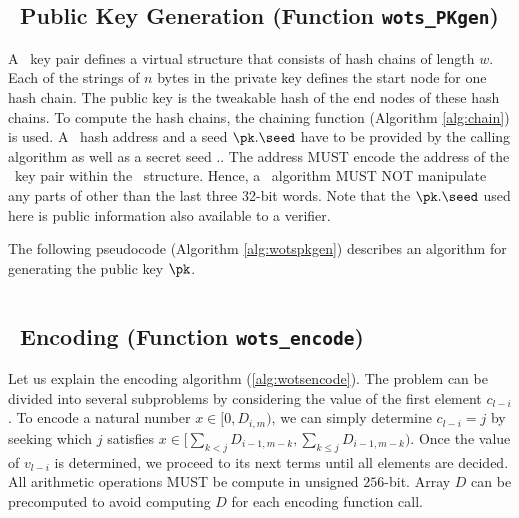 \subsection{\WOTSCS\ Public Key Generation (Function \texttt{wots\_PKgen})}

A \WOTSCS\ key pair defines a virtual structure that consists of \wotslen hash chains of length $w.$ Each of the \wotslen strings of $n$ bytes in the private key defines the start node for one hash chain. The public key is the tweakable hash of the end nodes of these hash chains. To compute the hash chains, the chaining function (Algorithm \ref{alg:chain}) is used. A \WOTSCS\ hash address \ADRS and a seed $\pk.\seed$ have to be provided by the calling algorithm as well as a secret seed \sk.\seed. The address \ADRS MUST encode the address of the \WOTSCS\ key pair within the \SPHINCSA\ structure. Hence, a \WOTSCS\ algorithm MUST NOT manipulate any parts of \ADRS other than the last three 32-bit words. Note that the $\pk.\seed$ used here is public information also available to a verifier.

The following pseudocode (Algorithm \ref{alg:wotspkgen}) describes an algorithm for generating the public key $\pk$.

\begin{algorithm}
\inputminted[breaklines,linenos,tabsize=2,mathescape,escapeinside=||]{C}{paper/code/wots_PKgen.cs}
\caption{\texttt{wots\_PKgen} --- Generating a \WOTSCS\ public key.}
\label{alg:wotspkgen}
\end{algorithm}


\subsection{\WOTSCS\ Encoding (Function \texttt{wots\_encode})}

Let us explain the encoding algorithm (\cref{alg:wotsencode}). The problem can be divided into several subproblems by considering the value of the first element $c_{l-i}$. To encode a natural number $x\in [0,D_{i,m})$, we can simply determine $c_{l-i}=j$ by seeking which $j$ satisfies $x\in [\sum_{k<j}D_{i-1,m-k},\sum_{k\leq j}D_{i-1,m-k})$. Once the value of $v_{l-i}$ is determined, we proceed to its next terms until all elements are decided. All arithmetic operations MUST be compute in unsigned $256$-bit. Array $D$ can be precomputed to avoid computing $D$ for each encoding function call. 

\begin{algorithm}
\inputminted[breaklines,linenos,tabsize=2,mathescape,escapeinside=||]{C}{paper/code/wots_encode.cs}
\caption{\texttt{wots\_encode} --- Encoding message to constant-sum encoding.}
\label{alg:wotsencode}
\end{algorithm}

